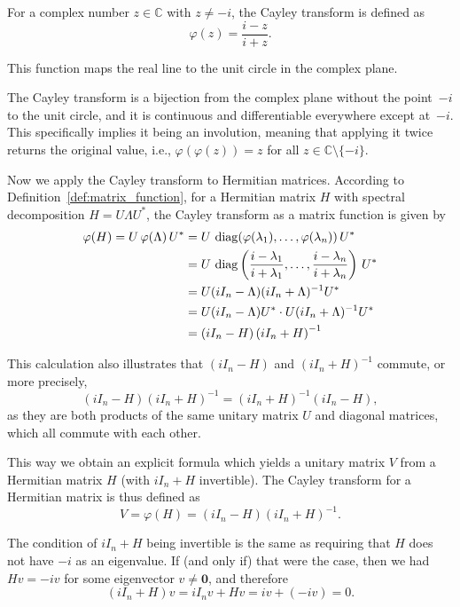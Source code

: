 For a complex number $z \in \mathbb{C}$ with $z \neq -i$, the Cayley transform is defined as
\[
\varphi(z) = \frac{i - z}{i + z}.
\]

This function maps the real line to the unit circle in the complex plane.

\vspace{0.5cm}



The Cayley transform is a bijection from the complex plane without the point~$-i$ to the unit circle, and it is continuous and differentiable everywhere except at~$-i$. This specifically implies it being an involution, meaning that applying it twice returns the original value, i.e., $\varphi(\varphi(z)) = z$ for all $z \in \mathbb{C} \setminus \{-i\}$.

Now we apply the Cayley transform to Hermitian matrices. According to Definition~\ref{def:matrix_function}, for a Hermitian matrix $H$ with spectral decomposition $H = U \Lambda U^*$, the Cayley transform as a matrix function is given by
\begin{align*}
    \varphi(H) = U \, \varphi(\Lambda) \, U^* & = U \, \operatorname{diag}(\varphi(\lambda_1), \ldots, \varphi(\lambda_n)) \, U^*\\
    & = U \, \operatorname{diag}\left(\frac{i - \lambda_1}{i + \lambda_1}, \ldots, \frac{i - \lambda_n}{i + \lambda_n}\right) \, U^*\\
    & = U (i I_n - \Lambda) (i I_n + \Lambda)^{-1} U^*\\
    & = U (i I_n - \Lambda) U^* \cdot U (i I_n + \Lambda)^{-1} U^*\\
    & = (i I_n - H) \left( i I_n + H \right)^{-1}
\end{align*}

This calculation also illustrates that $(i I_n - H)$ and $(i I_n + H)^{-1}$ commute, or more precisely, 
\[
(i I_n - H)(i I_n + H)^{-1} = (i I_n + H)^{-1}(i I_n - H),
\]
as they are both products of the same unitary matrix $U$ and diagonal matrices, which all commute with each other.

This way we obtain an explicit formula which yields a unitary matrix $V$ from a Hermitian matrix $H$ (with $i I_n+ H$ invertible). The Cayley transform for a Hermitian matrix is thus defined as
\[
V = \varphi(H) = (i I_n - H)(i I_n + H)^{-1}.
\]

The condition of $i I_n + H$ being invertible is the same as requiring that $H$ does not have $-i$ as an eigenvalue. If (and only if) that were the case, then we had $H v = -i v$ for some eigenvector $v \neq \mathbf{0}$, and therefore
\[
(i I_n + H) v = i I_n v + H v = i v + (-i v) = 0.
\]


